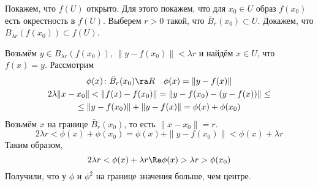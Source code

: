 	\item[Шаг 2:]
		Покажем, что $f(U)$ открыто.
		Для этого покажем, что для $x_0 \in U$ образ $f(x_0)$ есть окрестность в $f(U)$.
		Выберем $r > 0$ такой, что $\bar B_r (x_0) \subset U$.
		Докажем, что $B_{\lambda r} (f(x_0)) \subset f(U)$.

		Возьмём $y \in B_{\lambda r} (f(x_0))$, $\|y - f(x_0)\| < \lambda r$ и найдём $x \in U$, что $f(x) = y$.
		Рассмотрим
		\begin{gather*}
			\phi(x)\colon \bar B_r(x_0) \ra R \quad \phi(x) = \|y - f(x)\| \\
			2\lambda \|x-x_0\| < \|f(x) - f(x_0)\| = \| y - f(x_0) - (y - f(x)) \| \le \\
			\le \|y - f(x_0)\| + \|y - f(x)\| = \phi(x) + \phi(x_0)
		\end{gather*}
		Возьмём $x$ на границе $\bar B_r(x_0)$, то есть $\|x - x_0\| = r$.
		\[ 2\lambda r < \phi(x) + \phi(x_0) = \phi(x) + \|y - f(x_0)\| < \phi(x) + \lambda r \]
		Таким образом,
		\[ 2\lambda r < \phi(x) + \lambda r \Ra \phi(x) > \lambda r > \phi(x_0) \]
		Получили, что у $\phi$ и $\phi^2$ на границе значения больше, чем центре.

